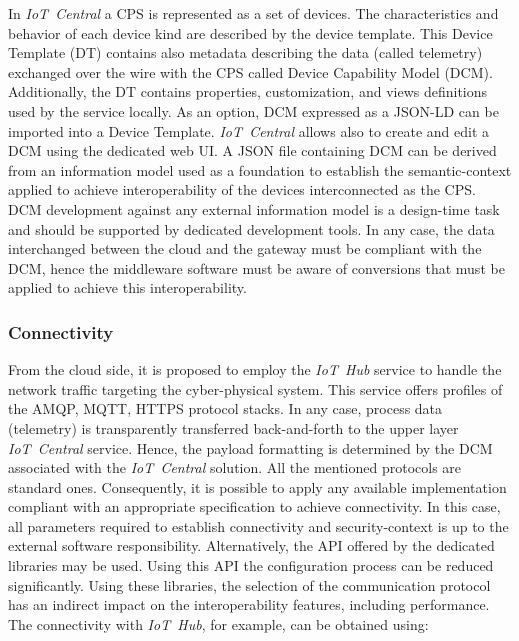 \documentclass{jacsart}
\begin{document}
In \textit{IoT\ Central} a CPS is represented as a set
of devices. The characteristics and behavior of each device kind are
described by the device template. This Device Template (DT) contains
also metadata describing the data (called telemetry) exchanged over the
wire with the CPS called Device Capability Model
(DCM). Additionally, the DT contains properties, customization, and
views definitions used by the service locally. As an option, DCM
expressed as a JSON-LD can be imported into a Device Template.
\textit{IoT\ Central} allows also to create and edit a DCM using the
dedicated web UI. A JSON file containing DCM can be derived from an
information model used as a foundation to establish the semantic-context
applied to achieve interoperability of the devices interconnected as the
CPS. DCM development against any external information
model is a design-time task and should be supported by dedicated
development tools. In any case, the data interchanged between the cloud
and the gateway must be compliant with the DCM, hence the middleware
software must be aware of conversions that must be applied to achieve
this interoperability.

\subsubsection{Connectivity}\label{connectivity}

From the cloud side, it is proposed to employ the \textit{IoT\ Hub}
service to handle the network traffic targeting the cyber-physical
system. This service offers profiles of the AMQP, MQTT, HTTPS protocol
stacks. In any case, process data (telemetry) is transparently
transferred back-and-forth to the upper layer \textit{IoT\ Central}
service. Hence, the payload formatting is determined by the DCM
associated with the \textit{IoT\ Central} solution. All the mentioned
protocols are standard ones. Consequently, it is possible to apply any
available implementation compliant with an appropriate specification to
achieve connectivity. In this case, all parameters required to establish
connectivity and security-context is up to the external software
responsibility. Alternatively, the API offered by the dedicated
libraries may be used. Using this API the configuration process can be
reduced significantly. Using these libraries, the selection of the
communication protocol has an indirect impact on the interoperability
features, including performance. The connectivity with
\textit{IoT\ Hub}, for example, can be obtained using:
\end{document}
